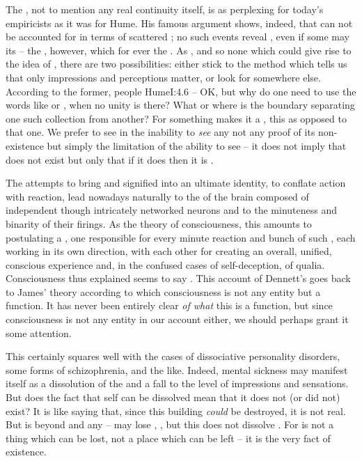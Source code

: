 \pa The , not to mention any real continuity itself, is
as perplexing for today's empiricists as it was for Hume. His famous argument
shows, indeed, that  can not be accounted for in terms of scattered
 ; no such events reveal , even
if some may  its  -- the , however, which
for ever  the \hoa.  As , and so none which could give rise to the idea of , there
are two possibilities: either stick to the method which tells us that only
impressions and perceptions matter, or look for  somewhere else.
According to the former, people \citet{are nothing but a bundle or collection of
  different perceptions}{Hume}{I:4.6} -- OK, but why do one need to use the
words like  or , when no unity is there? What or where
is the boundary separating one such collection from another? For something makes
it a , this  as opposed to that one. We prefer
to see in the inability to {\em see} any  not any proof of its
non-existence but simply the limitation of the  ability to see -- it
does not imply that  does not exist but only that if it does then it is
.

The attempts to bring  and signified into an ultimate
identity, to conflate action with reaction, lead nowadays naturally to the
 of the brain composed of independent though intricately
networked neurons and to the minuteness and binarity of their firings.
As the theory of consciousness, this amounts to postulating a
, one  responsible for every minute
reaction and bunch of such , each working in its own
direction,  with each other for creating an overall,
unified, conscious experience and, in the confused cases of
self-deception, of qualia.  Consciousness thus explained seems to say
.  This account of Dennett's goes back
to James' theory according to which consciousness is not any
entity but a function.  It has never been entirely clear {\em of what}
this is a function, but since consciousness is not any entity in our account
either, we should perhaps grant it some attention.

\pa This certainly squares well with the cases of dissociative personality
disorders, some forms of schizophrenia, and the like.  Indeed, mental sickness
may manifest itself as a dissolution of the  and a
fall to the level of  impressions and sensations.  But does the
fact that self can be dissolved mean that it does not (or did not) exist?  It is
like saying that, since this building {\em could} be destroyed, it is not real. But
 is beyond and  any  -- 
may lose ,  , but this does not dissolve
. For  is not a thing which can be lost, not a place which can
be left -- it is the very fact of  existence.

